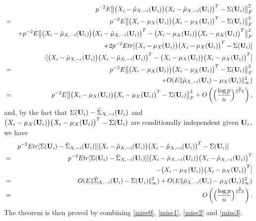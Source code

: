 \documentclass[11pt]{article}
\theoremstyle{definition}
\begin{document}
 \begin{eqnarray}\label{mise2}
 	&&p^{-2}	E\big\| \big(X_{i}-\hat{\mu}_{X,-i}({\bf U}_i)\big) \big(X_{i}-\hat{\mu}_{X,-i}({\bf U}_i)\big)^T- \Sigma({\bf U}_i)\big\|_F^2 \\
 	&=&p^{-2}	E\big\| \big(X_{i}-{\mu}_X({\bf U}_i)\big) \big(X_{i}-{\mu}_X({\bf U}_i)\big)^T- \Sigma({\bf U}_i)\big\|_F^2\nonumber \\
 	&&+p^{-2}	E\big\|  \big(X_{i}-\hat{\mu}_{X,-i}({\bf U}_i)\big) \big(X_{i}-\hat{\mu}_{X,-i}({\bf U}_i)\big)^T-\big(X_{i}-{\mu}_X({\bf U}_i)\big) \big(X_{i}-{\mu}_X({\bf U}_i)\big)^T\big\|_F^2 \nonumber\\
 	&&+2p^{-2}	E tr[ \big(X_{i}-{\mu}_X({\bf U}_i)\big) \big(X_{i}-{\mu}_X({\bf U}_i)\big)^T- \Sigma({\bf U}_i)] \nonumber\\
 	&&\cdot[\big(X_{i}-\hat{\mu}_{X,-i}({\bf U}_i)\big) \big(X_{i}-\hat{\mu}_{X,-i}({\bf U}_i)\big)^T-\big(X_{i}-{\mu}_X({\bf U}_i)\big) \big(X_{i}-{\mu}_X({\bf U}_i)\big)^T]\nonumber\\
 	&=&p^{-2}	E\big\| \big(X_{i}-{\mu}_X({\bf U}_i)\big) \big(X_{i}-{\mu}_X({\bf U}_i)\big)^T- \Sigma({\bf U}_i)\big\|_F^2\nonumber\\
 	&&
 	+O(E\|\hat{\mu}_{X,-i}({\bf U}_i)-{\mu}_X({\bf U}_i)\|_\infty^2) \nonumber\\
 	&=&p^{-2}	E\big\| \big(X_{i}-{\mu}_X({\bf U}_i)\big) \big(X_{i}-{\mu}_X({\bf U}_i)\big)^T- \Sigma({\bf U}_i)\big\|_F^2 +O\left(\Big(\frac{\log p}{n}\Big)^{\frac{2}{2+d}}\right),\nonumber
 \end{eqnarray}
 and, by the fact that $\Sigma({\bf U}_i)-\hat{\Sigma}_{X,-i}({\bf U}_i)$ and $
 \big(X_{i}-{\mu}_{X}({\bf U}_i)\big) \big(X_{i}-{\mu}_{X}({\bf U}_i)\big)^T- \Sigma({\bf U}_i) $ are conditionally independent given ${\bf U}_i$, we have
 \begin{eqnarray}\label{mise3}
 	&&p^{-2}	E tr[ \Sigma({\bf U}_i)-\hat{\Sigma}_{X,-i}({\bf U}_i)] 
 	[ \big(X_{i}-\hat{\mu}_{X,-i}({\bf U}_i)\big) \big(X_{i}-\hat{\mu}_{X,-i}({\bf U}_i)\big)^T- \Sigma({\bf U}_i)] ~~~~~~~~~~~\\
 	&=&p^{-2}	E tr[ \Sigma({\bf U}_i)-\hat{\Sigma}_{X,-i}({\bf U}_i)] 
 	[ \big(X_{i}-\hat{\mu}_{X,-i}({\bf U}_i)\big) \big(X_{i}-\hat{\mu}_{X,-i}({\bf U}_i)\big)^T\nonumber\\
 	&&-    \big(X_{i}-{\mu}_{X}({\bf U}_i)\big) \big(X_{i}-{\mu}_{X}({\bf U}_i)\big)^T ] \nonumber \\
 	&=&O(	E\|\hat{\Sigma}_{X,-i}({\bf U}_i)-{\Sigma}({\bf U}_i)\|_\infty^2)+O(E\|\hat{\mu}_{X,-i}({\bf U}_i)-{\mu}_X({\bf U}_i)\|_\infty^2)\nonumber\\
 	&=&O\left(\Big(\frac{\log p}{n}\Big)^{\frac{2}{2+d}}\right).\nonumber
 \end{eqnarray}
 The theorem is then proved by combining \eqref{mise0}, \eqref{mise1}, \eqref{mise2} and \eqref{mise3}.
 
\end{document}
